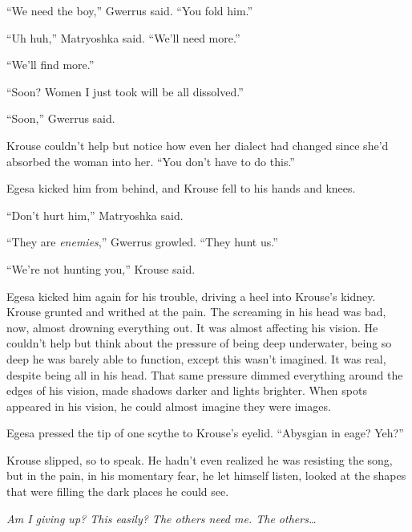 ``We need the boy,'' Gwerrus said.  ``You fold him.''



``Uh huh,'' Matryoshka said.  ``We'll need more.''



``We'll find more.''



``Soon?  Women I just took will be all dissolved.''



``Soon,'' Gwerrus said.



Krouse couldn't help but notice how even her dialect had changed since she'd absorbed the woman into her.  ``You don't have to do this.''



Egesa kicked him from behind, and Krouse fell to his hands and knees.



``Don't hurt him,'' Matryoshka said.



``They are \emph{enemies},'' Gwerrus growled.  ``They hunt us.''



``We're not hunting you,'' Krouse said.



Egesa kicked him again for his trouble, driving a heel into Krouse's kidney.  Krouse grunted and writhed at the pain.  The screaming in his head was bad, now, almost drowning everything out.  It was almost affecting his vision.  He couldn't help but think about the pressure of being deep underwater, being so deep he was barely able to function, except this wasn't imagined.  It was real, despite being all in his head.  That same pressure dimmed everything around the edges of his vision, made shadows darker and lights brighter.  When spots appeared in his vision, he could almost imagine they were images.



Egesa pressed the tip of one scythe to Krouse's eyelid.  ``Abysgian in eage?  Yeh?''



Krouse slipped, so to speak.  He hadn't even realized he was resisting the song, but in the pain, in his momentary fear, he let himself listen, looked at the shapes that were filling the dark places he could see.



\emph{Am I giving up?  This easily?  The others need me.  The others\ldots}



